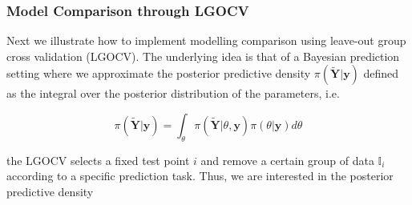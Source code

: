 \documentclass[
  letterpaper,
  DIV=11,
  numbers=noendperiod]{scrartcl}
\newenvironment{Shaded}{\begin{snugshade}}{\end{snugshade}}
\newcommand{\AttributeTok}[1]{\textcolor[rgb]{0.40,0.45,0.13}{#1}}
\newcommand{\CommentTok}[1]{\textcolor[rgb]{0.37,0.37,0.37}{#1}}
\newcommand{\DecValTok}[1]{\textcolor[rgb]{0.68,0.00,0.00}{#1}}
\newcommand{\ErrorTok}[1]{\textcolor[rgb]{0.68,0.00,0.00}{#1}}
\newcommand{\FunctionTok}[1]{\textcolor[rgb]{0.28,0.35,0.67}{#1}}
\newcommand{\NormalTok}[1]{\textcolor[rgb]{0.00,0.23,0.31}{#1}}
\newcommand{\OtherTok}[1]{\textcolor[rgb]{0.00,0.23,0.31}{#1}}
\newcommand{\SpecialCharTok}[1]{\textcolor[rgb]{0.37,0.37,0.37}{#1}}
\newcommand{\StringTok}[1]{\textcolor[rgb]{0.13,0.47,0.30}{#1}}
\begin{document}
\begin{Shaded}
\end{Shaded}

\subsubsection{Model Comparison through
LGOCV}\label{model-comparison-through-lgocv}

Next we illustrate how to implement modelling comparison using leave-out
group cross validation (LGOCV). The underlying idea is that of a
Bayesian prediction setting where we approximate the posterior
predictive density \(\pi(\mathbf{\tilde{Y}}|\mathbf{y})\) defined as the
integral over the posterior distribution of the parameters, i.e.

\[
\pi(\mathbf{\tilde{Y}}|\mathbf{y}) = \int_\theta \pi(\mathbf{\tilde{Y}}|\theta,\mathbf{y}) \pi(\theta|\mathbf{y})d\theta
\]

the LGOCV selects a fixed test point \(i\) and remove a certain group of
data \(\mathbb{I}_i\) according to a specific prediction task. Thus, we
are interested in the posterior predictive density
\end{document}
